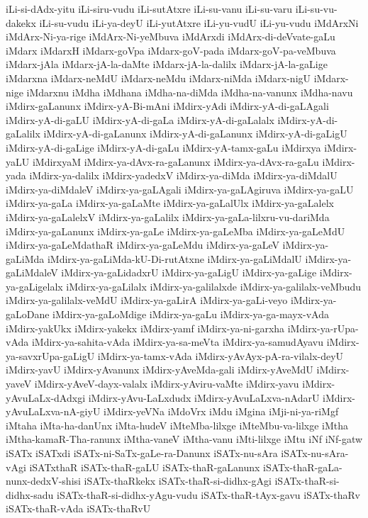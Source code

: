 {iLi-si-dAdx-yitu
iLi-siru-vudu
iLi-sutAtxre
iLi-su-vanu
iLi-su-varu
iLi-su-vu-dakekx
iLi-su-vudu
iLi-ya-deyU
iLi-yutAtxre
iLi-yu-vudU
iLi-yu-vudu
iMdArxNi
iMdArx-Ni-ya-rige
iMdArx-Ni-yeMbuva
iMdArxdi
iMdArx-di-deVvate-gaLu
iMdarx
iMdarxH
iMdarx-goVpa
iMdarx-goV-pada
iMdarx-goV-pa-veMbuva
iMdarx-jAla
iMdarx-jA-la-daMte
iMdarx-jA-la-dalilx
iMdarx-jA-la-gaLige
iMdarxna
iMdarx-neMdU
iMdarx-neMdu
iMdarx-niMda
iMdarx-nigU
iMdarx-nige
iMdarxnu
iMdha
iMdhana
iMdha-na-diMda
iMdha-na-vanunx
iMdha-navu
iMdirx-gaLanunx
iMdirx-yA-Bi-mAni
iMdirx-yAdi
iMdirx-yA-di-gaLAgali
iMdirx-yA-di-gaLU
iMdirx-yA-di-gaLa
iMdirx-yA-di-gaLalalx
iMdirx-yA-di-gaLalilx
iMdirx-yA-di-gaLanunx
iMdirx-yA-di-gaLanunx
iMdirx-yA-di-gaLigU
iMdirx-yA-di-gaLige
iMdirx-yA-di-gaLu
iMdirx-yA-tamx-gaLu
iMdirxya
iMdirx-yaLU
iMdirxyaM
iMdirx-ya-dAvx-ra-gaLanunx
iMdirx-ya-dAvx-ra-gaLu
iMdirx-yada
iMdirx-ya-dalilx
iMdirx-yadedxV
iMdirx-ya-diMda
iMdirx-ya-diMdalU
iMdirx-ya-diMdaleV
iMdirx-ya-gaLAgali
iMdirx-ya-gaLAgiruva
iMdirx-ya-gaLU
iMdirx-ya-gaLa
iMdirx-ya-gaLaMte
iMdirx-ya-gaLalUlx
iMdirx-ya-gaLalelx
iMdirx-ya-gaLalelxV
iMdirx-ya-gaLalilx
iMdirx-ya-gaLa-lilxru-vu-dariMda
iMdirx-ya-gaLanunx
iMdirx-ya-gaLe
iMdirx-ya-gaLeMba
iMdirx-ya-gaLeMdU
iMdirx-ya-gaLeMdathaR
iMdirx-ya-gaLeMdu
iMdirx-ya-gaLeV
iMdirx-ya-gaLiMda
iMdirx-ya-gaLiMda-kU-Di-rutAtxne
iMdirx-ya-gaLiMdalU
iMdirx-ya-gaLiMdaleV
iMdirx-ya-gaLidadxrU
iMdirx-ya-gaLigU
iMdirx-ya-gaLige
iMdirx-ya-gaLigelalx
iMdirx-ya-gaLilalx
iMdirx-ya-galilalxde
iMdirx-ya-galilalx-veMbudu
iMdirx-ya-galilalx-veMdU
iMdirx-ya-gaLirA
iMdirx-ya-gaLi-veyo
iMdirx-ya-gaLoDane
iMdirx-ya-gaLoMdige
iMdirx-ya-gaLu
iMdirx-ya-ga-mayx-vAda
iMdirx-yakUkx
iMdirx-yakekx
iMdirx-yamf
iMdirx-ya-ni-garxha
iMdirx-ya-rUpa-vAda
iMdirx-ya-sahita-vAda
iMdirx-ya-sa-meVta
iMdirx-ya-samudAyavu
iMdirx-ya-savxrUpa-gaLigU
iMdirx-ya-tamx-vAda
iMdirx-yAvAyx-pA-ra-vilalx-deyU
iMdirx-yavU
iMdirx-yAvanunx
iMdirx-yAveMda-gali
iMdirx-yAveMdU
iMdirx-yaveV
iMdirx-yAveV-dayx-valalx
iMdirx-yAviru-vaMte
iMdirx-yavu
iMdirx-yAvuLaLx-dAdxgi
iMdirx-yAvu-LaLxdudx
iMdirx-yAvuLaLxva-nAdarU
iMdirx-yAvuLaLxva-nA-giyU
iMdirx-yeVNa
iMdoVrx
iMdu
iMgina
iMji-ni-ya-riMgf
iMtaha
iMta-ha-danUnx
iMta-hudeV
iMteMba-lilxge
iMteMbu-va-lilxge
iMtha
iMtha-kamaR-Tha-ranunx
iMtha-vaneV
iMtha-vanu
iMti-lilxge
iMtu
iNf
iNf-gatw
iSATx
iSATxdi
iSATx-ni-SaTx-gaLe-ra-Danunx
iSATx-nu-sAra
iSATx-nu-sAra-vAgi
iSATxthaR
iSATx-thaR-gaLU
iSATx-thaR-gaLanunx
iSATx-thaR-gaLa-nunx-dedxV-shisi
iSATx-thaRkekx
iSATx-thaR-si-didhx-gAgi
iSATx-thaR-si-didhx-sadu
iSATx-thaR-si-didhx-yAgu-vudu
iSATx-thaR-tAyx-gavu
iSATx-thaRv
iSATx-thaR-vAda
iSATx-thaRvU
}
